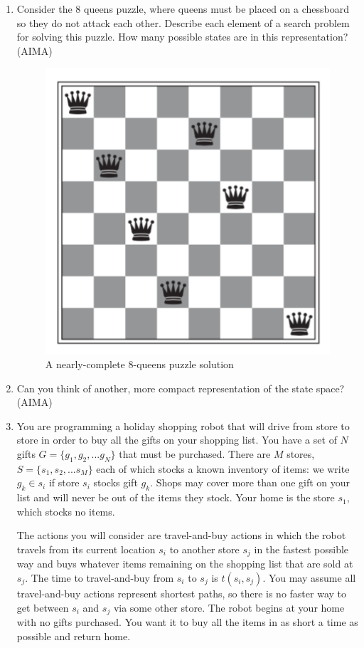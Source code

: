 \documentclass[11pt]{article}
\begin{document}
\begin{enumerate}
\item
Consider the 8 queens puzzle, where queens must be placed on a
chessboard so they do not attack each other. Describe each element of a
search problem for solving this puzzle. How many possible states are in
this representation? (AIMA)

\begin{figure}[h!t]
  \centering
  \caption{A nearly-complete 8-queens puzzle solution}
  \includegraphics{img/8queens}
\end{figure}

\item Can you think of another, more compact representation of the state space? (AIMA)

\newpage
\item
You are programming a holiday shopping robot that will drive from store to
store in order to buy all the gifts on your shopping list.  You have a set
of $N$ gifts $G = \{ g_1 ,g_2 ,...g_N \}$ that must be purchased.  There are
$M$ stores, $S = \{ s_1 ,s_2 ,...s_M \}$ each of which stocks a known inventory
of items:  we write $g_k \in s_i$ if store $s_i$ stocks gift $g_k$. Shops may
cover more than one gift on your list and will never be out of the items they
stock.  Your home is the store $s_1$, which stocks no items.

The actions you will consider are travel-and-buy actions
in which the robot travels from its current location $s_i$ to another
store $s_j$ in the fastest possible way and buys whatever items remaining on
the shopping list that are sold at $s_j$.  The time to travel-and-buy from
$s_i$ to $s_j$ is $t(s_i,s_j)$.  You may assume all travel-and-buy actions
represent shortest paths, so there is no faster way to get between
$s_i$ and $s_j$ via some other store.  The robot begins at your home with no
gifts purchased.  You want it to buy all the items in as short a time as
possible and return home.


\end{enumerate}
\end{document}
